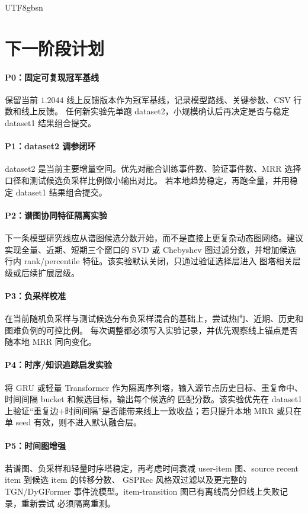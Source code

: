 \documentclass[letterpaper,11pt,leqno]{article}
\begin{document}
\begin{CJK*}{UTF8}{gbsn}
\section{下一阶段计划}

\paragraph{P0：固定可复现冠军基线}
保留当前 $1.2044$ 线上反馈版本作为冠军基线，记录模型路线、关键参数、CSV 行数和线上反馈。
任何新实验先单跑 dataset2，小规模确认后再决定是否与稳定 dataset1 结果组合提交。

\paragraph{P1：dataset2 调参闭环}
dataset2 是当前主要增量空间。优先对融合训练事件数、验证事件数、MRR 选择口径和测试候选负采样比例做小输出对比。
若本地趋势稳定，再跑全量，并用稳定 dataset1 结果组合提交。

\paragraph{P2：谱图协同特征隔离实验}
下一条模型研究线应从谱图候选分数开始，而不是直接上更复杂动态图网络。建议实现全量、近期、短期三个窗口的 SVD 或
Chebyshev 图过滤分数，并增加候选行内 rank/percentile 特征。该实验默认关闭，只通过验证选择层进入
图塔相关层级或后续扩展层级。

\paragraph{P3：负采样校准}
在当前随机负采样与测试候选分布负采样混合的基础上，尝试热门、近期、历史和图难负例的可控比例。
每次调整都必须写入实验记录，并优先观察线上锚点是否随本地 MRR 同向变化。

\paragraph{P4：时序/知识追踪启发实验}
将 GRU 或轻量 Transformer 作为隔离序列塔，输入源节点历史目标、重复命中、时间间隔 bucket 和候选目标，输出每个候选的
匹配分数。该实验优先在 dataset1 上验证“重复边+时间间隔”是否能带来线上一致收益；若只提升本地 MRR 或只在单 seed
有效，则不进入默认融合层。

\paragraph{P5：时间图增强}
若谱图、负采样和轻量时序塔稳定，再考虑时间衰减 user-item 图、source recent item 到候选 item 的转移分数、
GSPRec 风格双过滤以及更完整的 TGN/DyGFormer 事件流模型。item-transition 图已有离线高分但线上失败记录，重新尝试
必须隔离重测。


\end{CJK*}
\end{document}
